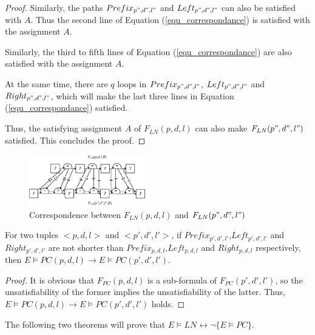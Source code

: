 \documentclass[journal]{IEEEtran}
\begin{document}
\begin{proof}
Similarly,
the paths $Prefix_{p",d",l"}$ and $Left_{p",d",l"}$ can also be satisfied with $A$.
Thus the second line of Equation (\ref{equ_correspondance}) is satisfied with the assignment $A$.

Similarly,
the third to fifth lines of Equation (\ref{equ_correspondance}) are also satisfied with the assignment $A$.

At the same time,
there are $q$ loops in $Prefix_{p",d",l"}$, $Left_{p",d",l"}$ and $Right_{p",d",l"}$,
which will make the last three lines in Equation (\ref{equ_correspondance}) satisfied.

Thus,
the satisfying assignment $A$ of $F_{LN}(p,d,l)$ can also make $F_{LN}(p",d",l")$ satisfied.
This concludes the proof.
\end{proof}

\begin{figure}[t]
\centering
\includegraphics[width=0.45\textwidth]{doubleloop_unfold_cmp}
\caption{Correspondence between $F_{LN}(p,d,l)$ and $F_{LN}(p",d",l")$}
\label{doubleloop_unfold_cmp}
\end{figure}

\begin{lemma}[]\label{lemma_pc_long}
For two tuples $<p,d,l>$ and $<p',d',l'>$,
if $Prefix_{p',d',l'}$,$Left_{p',d',l'}$ and $Right_{p',d',l'}$ are not shorter than $Prefix_{p,d,l}$,$Left_{p,d,l}$ and $Right_{p,d,l}$ respectively,
then $E\vDash PC(p,d,l)\to E\vDash PC(p',d',l')$.
\end{lemma}
\begin{proof}
It is obvious that $F_{PC}(p,d,l)$ is a sub-formula of $F_{PC}(p',d',l')$,
so the unsatisfiability of the former implies the unsatisfiability of the latter.
Thus,
$E\vDash PC(p,d,l)\to E\vDash PC(p',d',l')$ holds.
\end{proof}

The following two theorems will prove that $E\vDash LN\leftrightarrow \neg \{E\vDash PC\}$.
\end{document}
